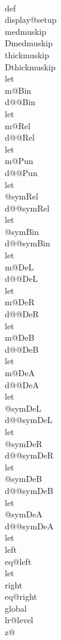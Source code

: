\\def\\display@setup{%
  \\medmuskip\\Dmedmuskip \\thickmuskip\\Dthickmuskip
  \\let\\m@Bin\\d@@Bin \\let\\m@Rel\\d@@Rel
  \\let\\m@Pun\\d@@Pun %
  \\let\\@symRel\\d@@symRel \\let\\@symBin\\d@@symBin
  \\let\\m@DeL\\d@@DeL \\let\\m@DeR\\d@@DeR \\let\\m@DeB\\d@@DeB
  \\let\\m@DeA\\d@@DeA
  \\let\\@symDeL\\d@@symDeL \\let\\@symDeR\\d@@symDeR
  \\let\\@symDeB\\d@@symDeB \\let\\@symDeA\\d@@symDeA
  \\let\\left\\eq@left \\let\\right\\eq@right \\global\\lr@level\\z@
}
